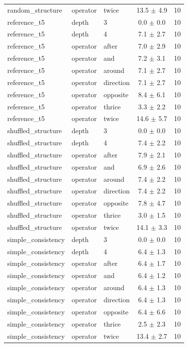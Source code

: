 \begin{longtable}{lllcc}
random\_structure & operator & twice & 13.5 $\pm$ 4.9 & 10 \\
reference\_t5 & depth & 3 & 0.0 $\pm$ 0.0 & 10 \\
reference\_t5 & depth & 4 & 7.1 $\pm$ 2.7 & 10 \\
reference\_t5 & operator & after & 7.0 $\pm$ 2.9 & 10 \\
reference\_t5 & operator & and & 7.2 $\pm$ 3.1 & 10 \\
reference\_t5 & operator & around & 7.1 $\pm$ 2.7 & 10 \\
reference\_t5 & operator & direction & 7.1 $\pm$ 2.7 & 10 \\
reference\_t5 & operator & opposite & 8.4 $\pm$ 6.1 & 10 \\
reference\_t5 & operator & thrice & 3.3 $\pm$ 2.2 & 10 \\
reference\_t5 & operator & twice & 14.6 $\pm$ 5.7 & 10 \\
shuffled\_structure & depth & 3 & 0.0 $\pm$ 0.0 & 10 \\
shuffled\_structure & depth & 4 & 7.4 $\pm$ 2.2 & 10 \\
shuffled\_structure & operator & after & 7.9 $\pm$ 2.1 & 10 \\
shuffled\_structure & operator & and & 6.9 $\pm$ 2.6 & 10 \\
shuffled\_structure & operator & around & 7.4 $\pm$ 2.2 & 10 \\
shuffled\_structure & operator & direction & 7.4 $\pm$ 2.2 & 10 \\
shuffled\_structure & operator & opposite & 7.8 $\pm$ 4.7 & 10 \\
shuffled\_structure & operator & thrice & 3.0 $\pm$ 1.5 & 10 \\
shuffled\_structure & operator & twice & 14.1 $\pm$ 3.3 & 10 \\
simple\_consistency & depth & 3 & 0.0 $\pm$ 0.0 & 10 \\
simple\_consistency & depth & 4 & 6.4 $\pm$ 1.3 & 10 \\
simple\_consistency & operator & after & 6.4 $\pm$ 1.7 & 10 \\
simple\_consistency & operator & and & 6.4 $\pm$ 1.2 & 10 \\
simple\_consistency & operator & around & 6.4 $\pm$ 1.3 & 10 \\
simple\_consistency & operator & direction & 6.4 $\pm$ 1.3 & 10 \\
simple\_consistency & operator & opposite & 6.4 $\pm$ 6.6 & 10 \\
simple\_consistency & operator & thrice & 2.5 $\pm$ 2.3 & 10 \\
simple\_consistency & operator & twice & 13.4 $\pm$ 2.7 & 10 \\
\bottomrule
\end{longtable}
